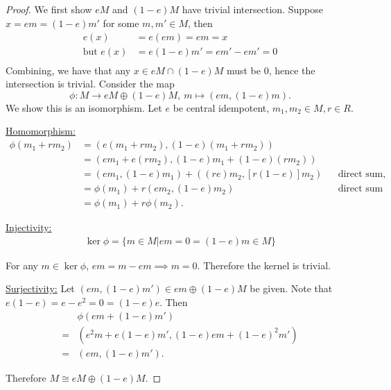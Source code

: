 \documentclass{article}
\theoremstyle{plain}
\begin{document}
\subsection{}
\begin{proof}
  We first show $eM$ and $(1-e)M$ have trivial intersection. Suppose
  $x=em=(1-e)m'$ for some $m, m'\in M$, then
  \begin{align*}
    e(x)&=e(em)=em=x\\
    \text{but } e(x) &= e(1-e)m' = em' - em' = 0\\
  \end{align*}
  Combining, we have that any $x\in eM\cap(1-e)M$ must be $0$, hence the intersection
  is trivial.
  Consider the map
  \[\phi:M\to eM\oplus(1-e)M,\ m\mapsto(em, (1-e)m).\]
  We show this is an isomorphism. Let $e$ be central idempotent,
  $m_{1},m_{2}\in M, r\in R$.

  \underline{Homomorphism:}
  \begin{align*}
    \phi(m_{1}+rm_{2})
    &=(e(m_{1}+rm_{2}), (1-e)(m_{1}+rm_{2}))\\
    &=(em_{1}+e(rm_{2}), (1-e)m_{1}+(1-e)(rm_{2}))\\
    &=(em_{1}, (1-e)m_{1}) + ((re)m_{2}, [r(1-e)]m_{2})
    &&\text{direct sum, central idempotence}\\
    &=\phi(m_{1}) + r(em_{2}, (1-e)m_{2})&&\text{direct sum of modules}\\
    &=\phi(m_{1}) + r\phi(m_{2}).
  \end{align*}

  \underline{Injectivity:}
  \begin{align*}
    \ker\phi=\{m\in M|em=0=(1-e)m\in M\}
  \end{align*}

  For any $m\in \ker\phi$, $em=m-em\implies m=0$. Therefore the kernel is trivial.

  \underline{Surjectivity:}
  Let $(em,(1-e)m')\in em\oplus(1-e)M$ be given.
  Note that $e(1-e)=e-e^{2}=0=(1-e)e$. Then
  \begin{align*}
    &\phi(em+(1-e)m')\\
    =&(e^{2}m+e(1-e)m', (1-e)em+{(1-e)}^{2}m')\\
    =&(em, (1-e)m').
  \end{align*}

  Therefore $M\cong eM\oplus(1-e)M$.
\end{proof}
\end{document}
